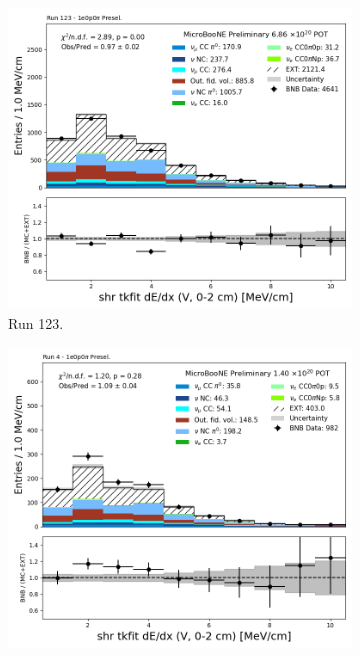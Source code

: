 \begin{figure}[H]
    \centering
    \begin{subfigure}[t]{0.32\linewidth}
        \includegraphics[width=\linewidth]{technote/Appendix_Preselection/Figures/1e0p0pi/Run123/shr_tkfit_2cm_dedx_V_Run123_1e0p0pi_Presel.png}
        \caption{Run 123.}
    \end{subfigure}%
    \hspace{0.2cm}%
    \begin{subfigure}[t]{0.32\linewidth}
        \includegraphics[width=\linewidth]{technote/Appendix_Preselection/Figures/1e0p0pi/Run4b/shr_tkfit_2cm_dedx_V_Run4b_1e0p0pi_Presel.png}

\end{subfigure}
\end{figure}
